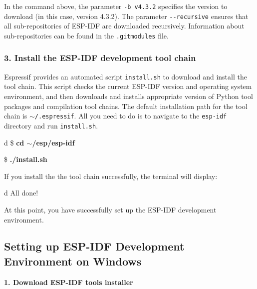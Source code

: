 \documentclass[a4paper,12pt]{book}
\begin{document}
In the command above, the parameter \verb|-b v4.3.2| specifies the version to download (in this case, version 4.3.2). The parameter \verb|--recursive| ensures that all sub-repositories of ESP-IDF are downloaded recursively. Information about sub-repositories can be found in the \verb|.gitmodules| file.

\subsubsection{3. Install the ESP-IDF development tool chain}
Espressif provides an automated script \verb|install.sh| to download and install the tool chain. This script checks the current ESP-IDF version and operating system environment, and then downloads and installs appropriate version of Python tool packages and compilation tool chains. The default installation path for the tool chain is \texttt{$\sim$/.espressif}. All you need to do is to navigate to the \verb|esp-idf| directory and run \verb|install.sh|.

\begin{codebloc}
\begin{tabular}{d}
\$ \textbf{cd $\sim$/esp/esp-idf}

\$ \textbf{./install.sh}
\end{tabular}
\end{codebloc}

If you install the the tool chain successfully, the terminal will display:

\begin{codebloc}
\begin{tabular}{d}
All done!
\end{tabular}
\end{codebloc}

At this point, you have successfully set up the ESP-IDF development environment.

\subsection{Setting up ESP-IDF Development Environment on Windows}
\textbf{1. Download ESP-IDF tools installer}

\end{document}
